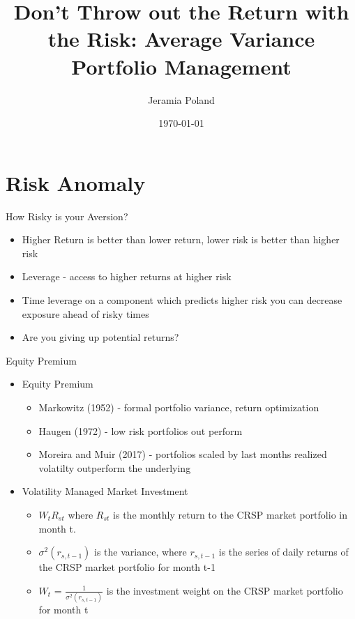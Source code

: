 \documentclass{beamer}
\begin{document}
\title[Average Variance]{Don't Throw out the Return with the Risk: Average Variance Portfolio Management}   
\author[J. Poland]{Jeramia Poland} 
\date{\today}

\begin{frame}
\titlepage
\end{frame}

\section{Risk Anomaly}

\begin{frame}{How Risky is your Aversion?}
	\begin{itemize}[<+->]
		\item Higher Return is better than lower return, lower risk is better than higher risk
		\item Leverage - access to higher returns at higher risk
		\item Time leverage on a component which predicts higher risk you can decrease exposure ahead of risky times
		\item Are you giving up potential returns?
	\end{itemize}
\end{frame}

\begin{frame}{Equity Premium}
	\begin{itemize}
		\item[] Equity Premium
				\begin{itemize}[<+->]
					\item Markowitz (1952) - formal portfolio variance, return optimization
					\item Haugen (1972) - low risk portfolios out perform
					\item Moreira and Muir (2017) - portfolios scaled by last months realized volatilty outperform the underlying
				\end{itemize}
		\item Volatility Managed Market Investment
				\begin{itemize}[<+->]
					\item $W_{t}R_{st}$ where $R_{st}$ is the monthly return to the CRSP market portfolio in month t.
					\item $\sigma^2(r_{s,t-1})$ is the variance, where $r_{s,t-1}$ is the series of daily returns of the CRSP market portfolio for month t-1
					\item $W_{t}$ = $\frac{1}{\sigma^2(r_{s,t-1})}$ is the investment weight on the CRSP market portfolio for month t
				\end{itemize}
	\end{itemize}
\end{frame}
\end{document}
